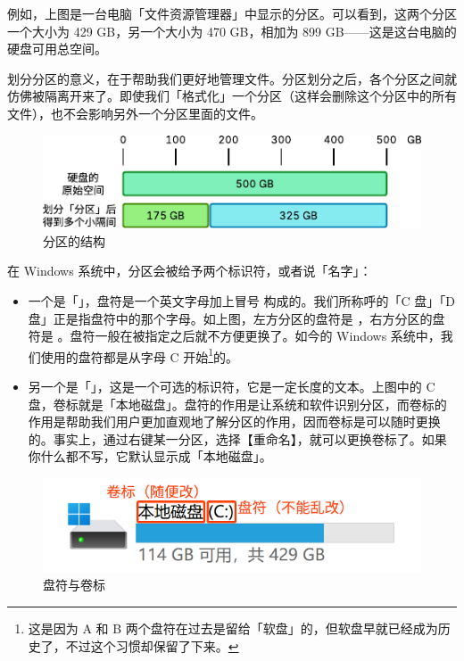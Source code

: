 例如，上图是一台电脑「文件资源管理器」中显示的分区。可以看到，这两个分区一个大小为 429 GB，另一个大小为 470 GB，相加为 899 GB——这是这台电脑的硬盘可用总空间。

划分分区的意义，在于帮助我们更好地管理文件。分区划分之后，各个分区之间就仿佛被隔离开来了。即使我们「格式化」一个分区（这样会删除这个分区中的所有文件），也不会影响另外一个分区里面的文件。

\begin{figure}[htb!]
  \centering
  \includegraphics[width=.9\textwidth]{assets/basic/Partition_structure.pdf}
  \caption{分区的结构}
  \label{fig:Partition_structure}
\end{figure}

在 Windows 系统中，分区会被给予两个标识符，或者说「名字」：

\begin{itemize}
  \item 一个是「」，盘符是一个英文字母加上冒号 \MissingVerb{:} 构成的。我们所称呼的「C 盘」「D 盘」正是指盘符中的那个字母。如上图，左方分区的盘符是  ，右方分区的盘符是  。盘符一般在被指定之后就不方便更换了。如今的 Windows 系统中，我们使用的盘符都是从字母 C 开始\footnote{这是因为 A 和 B 两个盘符在过去是留给「软盘」的，但软盘早就已经成为历史了，不过这个习惯却保留了下来。}的。
  \item 另一个是「」，这是一个可选的标识符，它是一定长度的文本。上图中的 C 盘，卷标就是「本地磁盘」。盘符的作用是让系统和软件识别分区，而卷标的作用是帮助我们用户更加直观地了解分区的作用，因而卷标是可以随时更换的。事实上，通过右键某一分区，选择【重命名】，就可以更换卷标了。如果你什么都不写，它默认显示成「本地磁盘」。
\end{itemize}

\begin{figure}[htb!]
  \centering
  \includegraphics[width=.5\textwidth]{assets/basic/Partition_labels.png}
  \caption{盘符与卷标}
  \label{fig:Partition_labels}
\end{figure}

